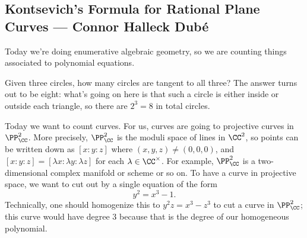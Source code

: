 \documentclass{article}
\begin{document}
\subsection{Kontsevich's Formula for Rational Plane Curves --- Connor Halleck Dub\'e}
Today we're doing enumerative algebraic geometry, so we are counting things associated to polynomial equations.
\begin{example}[Apollonius]
	Given three circles, how many circles are tangent to all three? The answer turns out to be eight: what's going on here is that such a circle is either inside or outside each triangle, so there are $2^3=8$ in total circles.
\end{example}
Today we want to count curves. For us, curves are going to projective curves in $\PP^2_\CC$. More precisely, $\PP^2_\CC$ is the moduli space of lines in $\CC^2$, so points can be written down as $[x:y:z]$ where $(x,y,z)\ne(0,0,0)$, and $[x:y:z]=[\lambda x:\lambda y:\lambda z]$ for each $\lambda\in\CC^\times$. For example, $\PP^2_\CC$ is a two-dimensional complex manifold or scheme or so on. To have a curve in projective space, we want to cut out by a single equation of the form
\[y^2=x^3-1.\]
Technically, one should homogenize this to $y^2z=x^3-z^3$ to cut a curve in $\PP^2_\CC$; this curve would have degree $3$ because that is the degree of our homogeneous polynomial.
\end{document}

